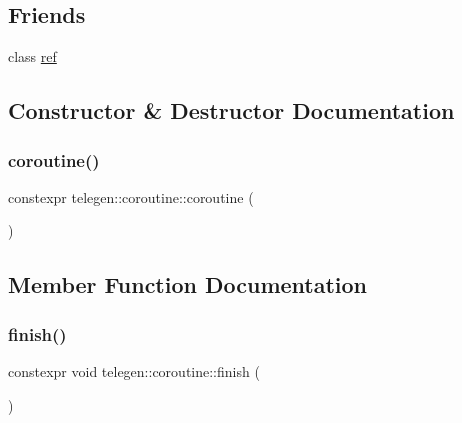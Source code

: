 \subsection*{Friends}
\begin{DoxyCompactItemize}
\item 
class \hyperlink{structtelegen_1_1coroutine_aa3d603af636458056061ae4b08fe9c18}{ref}
\end{DoxyCompactItemize}


\subsection{Constructor \& Destructor Documentation}
\mbox{\label{structtelegen_1_1coroutine_ac13b85fb7d6b08c684c69f1109c2f947}} 
\subsubsection{\texorpdfstring{coroutine()}{coroutine()}}
{\footnotesize\ttfamily constexpr telegen\+::coroutine\+::coroutine (\begin{DoxyParamCaption}{ }\end{DoxyParamCaption})\hspace{0.3cm}{\ttfamily [inline]}}



\subsection{Member Function Documentation}
\mbox{\label{structtelegen_1_1coroutine_a335f75302785f4ee9d8073caf8cfc60b}} 
\subsubsection{\texorpdfstring{finish()}{finish()}}
{\footnotesize\ttfamily constexpr void telegen\+::coroutine\+::finish (\begin{DoxyParamCaption}{ }\end{DoxyParamCaption})\hspace{0.3cm}{\ttfamily [inline]}}

\mbox{\label{structtelegen_1_1coroutine_a4e807c9f48ccfd7fd64a0b6ef2024da0}} 
